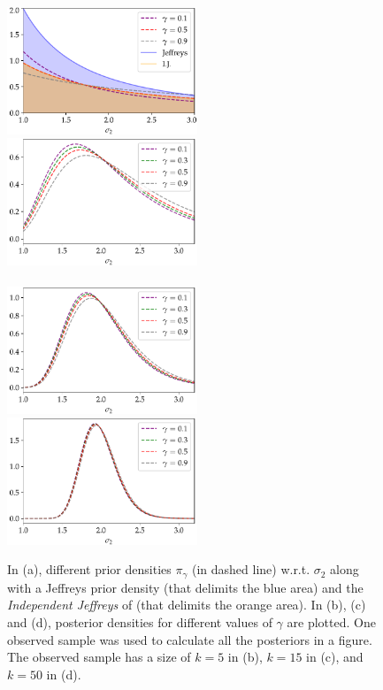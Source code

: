 \begin{figure}[h]%
    \centering%
    \includegraphics[width=5.7cm]{figures/constrained-priors/priors_.pdf}\hspace*{1cm}%
    \includegraphics[width=5.7cm]{figures/constrained-priors/post5.pdf}\\
    \\[5pt]
    \includegraphics[width=5.7cm]{figures/constrained-priors/post15.pdf}\hspace*{1cm}%
    \includegraphics[width=5.7cm]{figures/constrained-priors/post50.pdf}\\
    \caption{In (a), different prior densities $\pi_\gamma$ (in dashed line) w.r.t. $\sigma_2$ along with a Jeffreys prior density (that delimits the blue area) and the \emph{Independent Jeffreys} of \cite{rubio_inference_2014} (that delimits the orange area). In (b), (c) and (d), posterior densities for different values of $\gamma$ are plotted. %
    One observed sample was used to calculate all the posteriors in a figure.
    The observed sample has a size of $k=5$ in (b), $k=15$ in (c), and $k=50$ in (d).\label{fig:priorpost}}
\end{figure}
